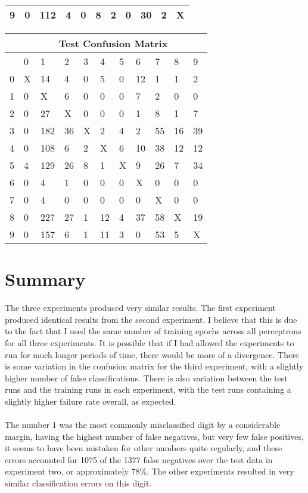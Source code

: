 \documentclass[titlepage,11pt]{article}
\begin{document}
{\begin{tabular}{|l|llllllllll|}
        9&    0& 112&   4&   0&   8&   2&   0&  30&   2&   X\\
        \hline
        \end{tabular}
        \begin{tabular}{|l|llllllllll|}
        \hline
        &\multicolumn{10}{c|}{\textbf{Test Confusion Matrix}}\\
        \hline
        &     0&   1&   2&   3&   4&   5&   6&   7&   8&   9\\
        \hline
        0&    X&  14&   4&   0&   5&   0&  12&   1&   1&   2\\
        1&    0&   X&   6&   0&   0&   0&   7&   2&   0&   0\\
        2&    0&  27&   X&   0&   0&   0&   1&   8&   1&   7\\
        3&    0& 182&  36&   X&   2&   4&   2&  55&  16&  39\\
        4&    0& 108&   6&   2&   X&   6&  10&  38&  12&  12\\
        5&    4& 129&  26&   8&   1&   X&   9&  26&   7&  34\\
        6&    0&   4&   1&   0&   0&   0&   X&   0&   0&   0\\
        7&    0&   4&   0&   0&   0&   0&   0&   X&   0&   0\\
        8&    0& 227&  27&   1&  12&   4&  37&  58&   X&  19\\
        9&    0& 157&   6&   1&  11&   3&   0&  53&   5&   X\\
        \hline
        \end{tabular}
}

\section[3]{Summary} {
    \hspace{2pt}  The three experiments produced very similar results. The first experiment produced identical results from the second experiment. I believe that this is due to the fact that I used the same number of training epochs across all perceptrons for all three experiments. It is possible that if I had allowed the experiments to run for much longer periods of time, there would be more of a divergence. There is some variation in the confusion matrix for the third experiment, with a slightly higher number of false classifications. There is also variation between the test runs and the training runs in each experiment, with the test runs containing a slightly higher failure rate overall, as expected.\\\\
    \hspace{2pt}  The number 1 was the most commonly misclassified digit by a considerable margin, having the highest number of false negatives, but very few false positives, it seems to have been mistaken for other numbers quite regularly, and these errors accounted for 1075 of the 1377 false negatives over the test data in experiment two, or approximately 78\%. The other experiments resulted in very similar classification errors on this digit.
}
\end{document}

